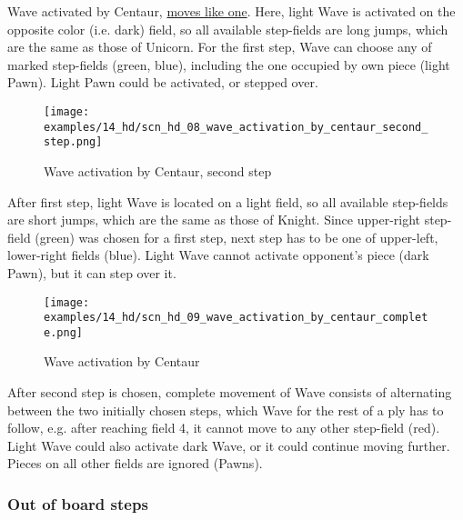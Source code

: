 Wave activated by Centaur, \hyperref[fig:scn_hd_01_centaur_same_color]{moves like one}.
Here, light Wave is activated on the opposite color (i.e. dark) field, so all available
step-fields are long jumps, which are the same as those of Unicorn. For the first step,
Wave can choose any of marked step-fields (green, blue), including the one occupied by
own piece (light Pawn). Light Pawn could be activated, or stepped over.

\clearpage %

\noindent
\begin{figure}[!h]
\texttt{[image: examples/14\_hd/scn\_hd\_08\_wave\_activation\_by\_centaur\_second\_step.png]}
\caption{Wave activation by Centaur, second step}
\label{fig:scn_hd_08_wave_activation_by_centaur_second_step}
\end{figure}

After first step, light Wave is located on a light field, so all available step-fields
are short jumps, which are the same as those of Knight. Since upper-right step-field
(green) was chosen for a first step, next step has to be one of upper-left, lower-right
fields (blue). Light Wave cannot activate opponent's piece (dark Pawn), but it can step
over it.

\clearpage %

\noindent
\begin{figure}[!h]
\texttt{[image: examples/14\_hd/scn\_hd\_09\_wave\_activation\_by\_centaur\_complete.png]}
\caption{Wave activation by Centaur}
\label{fig:scn_hd_09_wave_activation_by_centaur_complete}
\end{figure}

After second step is chosen, complete movement of Wave consists of alternating between
the two initially chosen steps, which Wave for the rest of a ply has to follow, e.g.
after reaching field 4, it cannot move to any other step-field (red). Light Wave could
also activate dark Wave, or it could continue moving further. Pieces on all other fields
are ignored (Pawns).

\clearpage %

\subsubsection*{Out of board steps}
\label{sec:Hemera's Dawn/Centaur/Activating Wave/Out of board steps}

